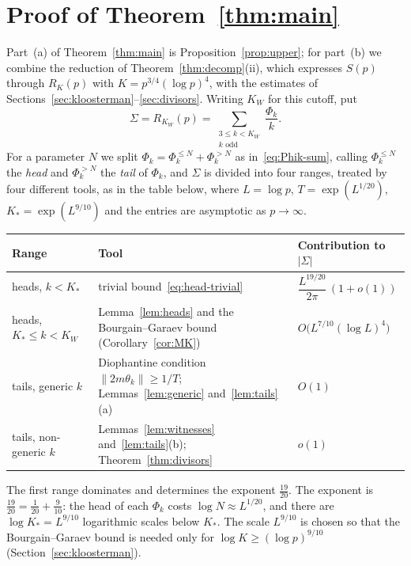 
\section{Proof of Theorem~\ref{thm:main}}\label{sec:proof}

Part~(a) of Theorem~\ref{thm:main} is Proposition~\ref{prop:upper}; for part~(b) we combine the reduction of Theorem~\ref{thm:decomp}(ii), which expresses $S(p)$ through $R_K(p)$ with $K=p^{3/4}(\log p)^4$, with the estimates of Sections~\ref{sec:kloosterman}--\ref{sec:divisors}. Writing $K_W$ for this cutoff, put
\[
\Sigma=R_{K_W}(p)=\sum_{\substack{3\le k<K_W\\ k\text{ odd}}}\frac{\Phi_k}{k}.
\]
For a parameter $N$ we split $\Phi_k=\Phi_k^{\le N}+\Phi_k^{>N}$ as in~\eqref{eq:Phik-sum}, calling $\Phi_k^{\le N}$ the \emph{head} and $\Phi_k^{>N}$ the \emph{tail} of $\Phi_k$, and $\Sigma$ is divided into four ranges, treated by four different tools, as in the table below, where $L=\log p$, $T=\exp(L^{1/20})$, $K_*=\exp(L^{9/10})$ and the entries are asymptotic as $p\to\infty$.

\medskip
\begin{center}
\small
\renewcommand{\arraystretch}{1.25}
\begin{tabular}{@{}p{3.0cm}p{6.0cm}p{4.2cm}@{}}
\toprule
Range & Tool & Contribution to $|\Sigma|$\\
\midrule
heads, $k<K_*$ & trivial bound~\eqref{eq:head-trivial} & $\dfrac{L^{19/20}}{2\pi}\,(1+o(1))$\\
heads, $K_*\le k<K_W$ & Lemma~\ref{lem:heads} and the Bourgain--Garaev bound (Corollary~\ref{cor:MK}) & $O\bigl(L^{7/10}(\log L)^4\bigr)$\\
tails, generic $k$ & Diophantine condition $\|2m\theta_k\|\ge1/T$; Lemmas~\ref{lem:generic} and~\ref{lem:tails}(a) & $O(1)$\\
tails, non-generic $k$ & Lemmas~\ref{lem:witnesses} and~\ref{lem:tails}(b); Theorem~\ref{thm:divisors} & $o(1)$\\
\bottomrule
\end{tabular}
\end{center}
\medskip

The first range dominates and determines the exponent $\frac{19}{20}$. The exponent is $\frac{19}{20}=\frac1{20}+\frac9{10}$: the head of each $\Phi_k$ costs $\log N\approx L^{1/20}$, and there are $\log K_*=L^{9/10}$ logarithmic scales below $K_*$. The scale $L^{9/10}$ is chosen so that the Bourgain--Garaev bound is needed only for $\log K\ge(\log p)^{9/10}$ (Section~\ref{sec:kloosterman}).

